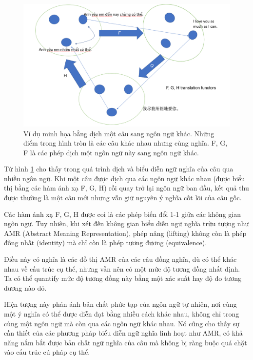 \begin{figure}[H]
    \centering
    \includegraphics[width=1\linewidth]{Images/GDL/amr_translation.png}
    \caption{Ví dụ minh họa bằng dịch một câu sang ngôn ngữ khác. Những điểm trong hình tròn là các câu khác nhau nhưng cùng nghĩa. F, G, F là các phép dịch một ngôn ngữ này sang ngôn ngữ khác.}
    \label{fig:amr_trans}
\end{figure}
Từ hình \ref{fig:amr_trans} cho thấy trong quá trình dịch và biểu diễn ngữ nghĩa của câu qua nhiều ngôn ngữ. Khi một câu được dịch qua các ngôn ngữ khác nhau (được biểu thị bằng các hàm ánh xạ F, G, H) rồi quay trở lại ngôn ngữ ban đầu, kết quả thu được thường là một câu mới nhưng vẫn giữ nguyên ý nghĩa cốt lõi của câu gốc.

Các hàm ánh xạ F, G, H được coi là các phép biến đổi 1-1 giữa các không gian ngôn ngữ. Tuy nhiên, khi xét đến không gian biểu diễn ngữ nghĩa trừu tượng như AMR (Abstract Meaning Representation), phép nâng (lifting) không còn là phép đồng nhất (identity) mà chỉ còn là phép tương đương (equivalence).

Điều này có nghĩa là các đồ thị AMR của các câu đồng nghĩa, dù có thể khác nhau về cấu trúc cụ thể, nhưng vẫn nên có một mức độ tương đồng nhất định. Ta có thể quantify mức độ tương đồng này bằng một xác suất hay độ đo tương đương nào đó.

Hiện tượng này phản ánh bản chất phức tạp của ngôn ngữ tự nhiên, nơi cùng một ý nghĩa có thể được diễn đạt bằng nhiều cách khác nhau, không chỉ trong cùng một ngôn ngữ mà còn qua các ngôn ngữ khác nhau. Nó cũng cho thấy sự cần thiết của các phương pháp biểu diễn ngữ nghĩa linh hoạt như AMR, có khả năng nắm bắt được bản chất ngữ nghĩa của câu mà không bị ràng buộc quá chặt vào cấu trúc cú pháp cụ thể.

